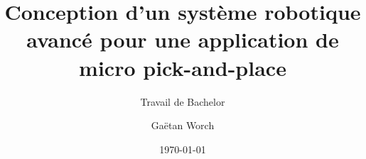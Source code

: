\author{Gaëtan Worch}


\title{Conception d'un système robotique avancé pour une application de micro pick-and-place}

\subtitle{Travail de Bachelor}


\date{\today}


